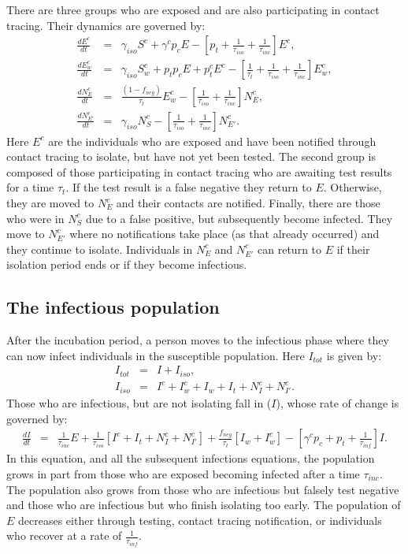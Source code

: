 \documentclass[notitlepage, superscriptaddress]{revtex4-2}
\begin{document}
There are three groups who are exposed and are also participating in contact tracing. Their dynamics are governed by:
\begin{eqnarray}
\label{E:dEc}
 \frac{dE^{c}}{dt} &=& \gamma_{iso} S^{c} + \gamma^{c} p_{c} E -[p_{t} +\frac{1}{\tau_{iso}} + \frac{1}{\tau_{inc}}] E^{c}, \\
 \frac{dE^{c}_{w}}{dt} &=& \gamma_{iso} S^{c}_{w} + p_{t}p_{c} E + p^{c}_{t}E^{c} - [\frac{1}{\tau_{t}}  + \frac{1}{\tau_{iso}}  + \frac{1}{\tau_{inc}}] E^{c}_{w}, \\ 
 \frac{dN^{c}_{E}}{dt} &=&  \frac{(1-f_{neg})}{\tau_{t}} E^{c}_{w} - [\frac{1}{\tau_{iso}}  + \frac{1}{\tau_{inc}}] N^{c}_{E}, \\ 
\frac{dN^{c}_{E'}}{dt} &=&  \gamma_{iso} N^{c}_{S} - [ \frac{1}{\tau_{iso}} + \frac{1}{\tau_{inc}}] N^{c}_{E'}. 
\end{eqnarray}
Here $E^{c}$ are the individuals who are exposed and have been notified through contact tracing to isolate, but have not yet been tested. The second group is composed of those participating in contact tracing who are awaiting test results for a time $\tau_{t}$. If the test result is a false negative they return to $E$. Otherwise, they are moved to $N^{c}_{E}$ and their contacts are notified. Finally, there are those who were in $N^{c}_{S}$ due to a false positive, but subsequently become infected. They move to $N^{c}_{E'}$ where no notifications take place (as that already occurred) and they continue to isolate. Individuals in $N^{c}_{E}$ and $N^{c}_{E'}$ can return to $E$ if their isolation period ends or if they become infectious.

\subsection{The infectious population}

After the incubation period, a person moves to the infectious phase where they can now infect individuals in the susceptible population. Here $I_{tot}$ is given by:
\begin{eqnarray}
\label{E:Itot}
I_{tot} &=& I + I_{iso}, \\ 
%
I_{iso} &=& I^{c} + I^{c}_{w} + I_{w} + I_{t} + N^{c}_{I} + N^{c}_{I'}.
\end{eqnarray}
 Those who are infectious, but are not isolating fall in ($I$), whose rate of change is governed by:
\begin{eqnarray}
\label{E:dI}
\frac{dI}{dt} &=& \frac{1}{\tau_{inc}}E  + \frac{1}{\tau_{iso}}[I^{c} + I_{t} + N^{c}_{I} + N^{c}_{I'}] + \frac{f_{neg}}{\tau_{t}}[I_{w} + I^{c}_{w}] -  [\gamma^{c} p_{c} +p_{t} + \frac{1}{\tau_{inf}}] I.
\end{eqnarray}
In this equation, and all the subsequent infections equations, the population grows in part from those who are exposed becoming infected after a time $\tau_{inc}$. The population also grows from those who are infectious but falsely test negative and those who are infectious but who finish isolating too early. The population of $E$ decreases either through testing, contact tracing notification, or individuals who recover at a rate of $\frac{1}{\tau_{inf}}$. 
\end{document}
